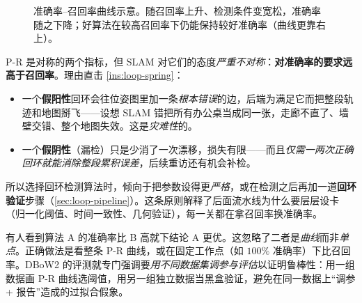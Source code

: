 \begin{figure}[ht]
\centering
{}
\caption{准确率--召回率曲线示意。随召回率上升、检测条件变宽松，准确率随之下降；好算法在较高召回率下仍能保持较好准确率（曲线更靠右上）。}
\label{fig:loop-prcurve}
\end{figure}

\begin{insight}\label{ins:loop-precision}
P-R 是对称的两个指标，但 SLAM 对它们的态度\emph{严重不对称}\cite{gaoxiang2019slam14}：\textbf{对准确率的要求远高于召回率}。理由直击 \cref{ins:loop-spring}：
\begin{itemize}
  \item 一个\textbf{假阳性}回环会往位姿图里加一条\emph{根本错误}的边，后端为满足它而把整段轨迹和地图掰飞——设想 SLAM 错把所有办公桌当成同一张，走廊不直了、墙壁交错、整个地图失效。这是\emph{灾难性}的。
  \item 一个\textbf{假阴性}（漏检）只是少消了一次漂移，损失有限——而且\emph{仅需一两次正确回环就能消除整段累积误差}，后续重访还有机会补检。
\end{itemize}
所以选择回环检测算法时，倾向于把参数设得更\emph{严格}，或在检测之后再加一道\textbf{回环验证}步骤（\cref{sec:loop-pipeline}）。这条原则解释了后面流水线为什么要层层设卡（归一化阈值、时间一致性、几何验证），每一关都在拿召回率换准确率。
\end{insight}

\begin{pitfall}
有人看到算法 A 的准确率比 B 高就下结论 A 更优。这忽略了二者是\emph{曲线}而非\emph{单点}。正确做法是看整条 P-R 曲线，或在固定工作点（如 $100\%$ 准确率）下比召回率。DBoW2 的评测就专门强调要\emph{用不同数据集调参与评估}以证明鲁棒性\cite{galvez2012bags}：用一组数据画 P-R 曲线选阈值，用另一组独立数据当黑盒验证，避免在同一数据上“调参 + 报告”造成的过拟合假象。
\end{pitfall}

